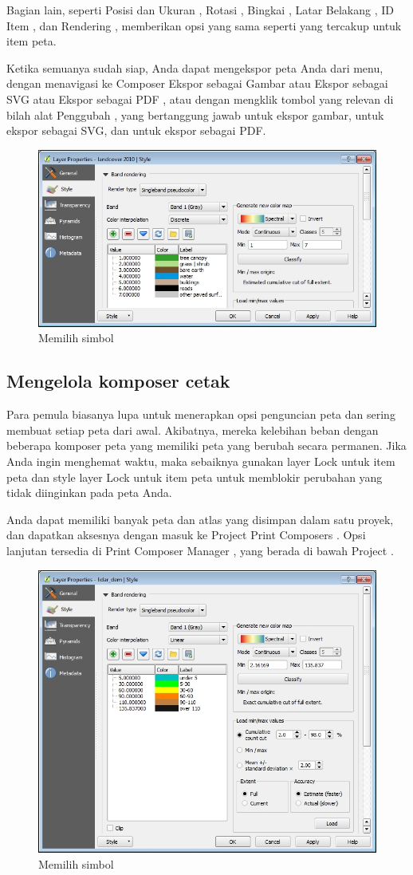 \documentclass[]{book}
\begin{document}
Bagian lain, seperti Posisi dan Ukuran , Rotasi , Bingkai , Latar Belakang , ID Item , dan Rendering , memberikan opsi yang sama seperti yang tercakup untuk item peta.

Ketika semuanya sudah siap, Anda dapat mengekspor peta Anda dari menu, dengan menavigasi ke Composer \textbar{} Ekspor sebagai Gambar atau Ekspor sebagai SVG atau Ekspor sebagai PDF , atau dengan mengklik tombol yang relevan di bilah alat Penggubah , yang bertanggung jawab untuk ekspor gambar, untuk ekspor sebagai SVG, dan untuk ekspor sebagai PDF.

\begin{figure}

{\centering \includegraphics[width=0.6\linewidth]{images/09/fig911} 

}

\caption{Memilih simbol}\label{fig:fig911}
\end{figure}

\hypertarget{mengelola-komposer-cetak}{%
\subsection{Mengelola komposer cetak}\label{mengelola-komposer-cetak}}

Para pemula biasanya lupa untuk menerapkan opsi penguncian peta dan sering membuat setiap peta dari awal. Akibatnya, mereka kelebihan beban dengan beberapa komposer peta yang memiliki peta yang berubah secara permanen. Jika Anda ingin menghemat waktu, maka sebaiknya gunakan layer Lock untuk item peta dan style layer Lock untuk item peta untuk memblokir perubahan yang tidak diinginkan pada peta Anda.

Anda dapat memiliki banyak peta dan atlas yang disimpan dalam satu proyek, dan dapatkan aksesnya dengan masuk ke Project \textbar{} Print Composers . Opsi lanjutan tersedia di Print Composer Manager , yang berada di bawah Project .

\begin{figure}

{\centering \includegraphics[width=0.3\linewidth]{images/09/fig912} 

}

\caption{Memilih simbol}\label{fig:fig912}
\end{figure}
\end{document}
